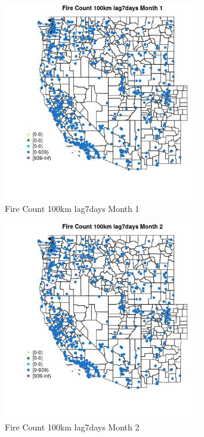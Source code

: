 \begin{figure} 
\centering  
\includegraphics[width=0.77\textwidth]{Code_Outputs/Report_ML_input_PM25_Step4_part_e_de_duplicated_aves_compiled_2019-05-21wNAs_MapObsMo1Fire_Count_100km_lag7days.jpg} 
\caption{\label{fig:Report_ML_input_PM25_Step4_part_e_de_duplicated_aves_compiled_2019-05-21wNAsMapObsMo1Fire_Count_100km_lag7days}Fire Count 100km lag7days Month 1} 
\end{figure} 
 

\begin{figure} 
\centering  
\includegraphics[width=0.77\textwidth]{Code_Outputs/Report_ML_input_PM25_Step4_part_e_de_duplicated_aves_compiled_2019-05-21wNAs_MapObsMo2Fire_Count_100km_lag7days.jpg} 
\caption{\label{fig:Report_ML_input_PM25_Step4_part_e_de_duplicated_aves_compiled_2019-05-21wNAsMapObsMo2Fire_Count_100km_lag7days}Fire Count 100km lag7days Month 2} 
\end{figure} 
 

